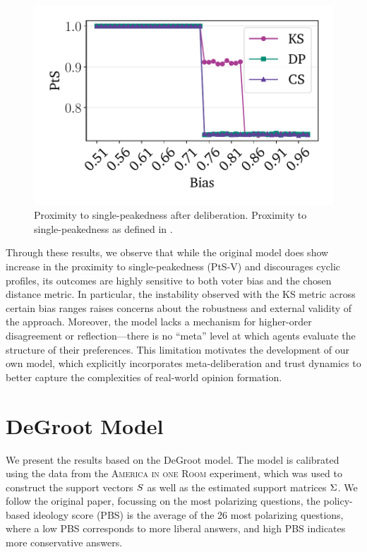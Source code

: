 \begin{figure}[htbp]
	\begin{minipage}{0.45\textwidth}
		\centering
		\vspace{-9pt}
		\includegraphics[width=\textwidth]{Figures/sp_proximity_PtS.pdf}
		\caption{Proximity to single-peakedness after deliberation. Proximity to single-peakedness as defined in .}
		\label{fig:rep_single_peaked}
	\end{minipage}
\end{figure}

Through these results, we observe that while the original model does show
increase in the proximity to single-peakedness (PtS-V) and discourages cyclic
profiles, its outcomes are highly sensitive to both voter bias and the chosen
distance metric. In particular, the instability observed with the KS metric
across certain bias ranges raises concerns about the robustness and external
validity of the approach. Moreover, the model lacks a mechanism for
higher-order disagreement or reflection—there is no ``meta'' level at which
agents evaluate the structure of their preferences. This limitation motivates
the development of our own model, which explicitly incorporates
meta-deliberation and trust dynamics to better capture the complexities of
real-world opinion formation.

\newpage
\section{DeGroot Model}\label{degroot_results}

We present the results based on the DeGroot model. The model is calibrated using the
data from the \textsc{America in one Room} experiment, which was used to
construct the support vectors $S$ as well as the estimated support
matrices $\Sigma$. We follow the original paper, focussing on the most
polarizing questions, the
policy-based ideology score (PBS) is the average of the 26 most polarizing
questions, where a low PBS corresponds to more liberal answers, and high PBS
indicates more conservative answers.

